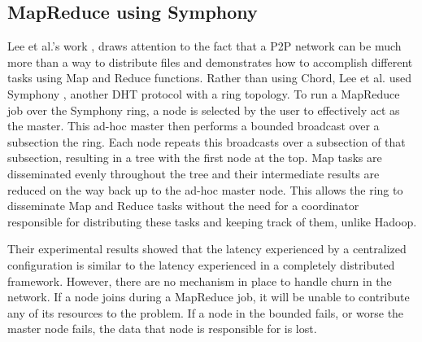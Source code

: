 \documentclass[10pt, conference, compsocconf]{IEEEtran}
\begin{document}

\subsection{MapReduce using Symphony}

Lee et al.'s work \cite{leemap}, draws attention to the fact that a P2P network can be much more than a way to distribute files and demonstrates how to accomplish different tasks using Map and Reduce functions.  Rather than using Chord, Lee et al. used Symphony \cite{symphony}, another DHT protocol with a ring topology.  To run a MapReduce job over the Symphony ring, a node is selected by the user to effectively act as the master.  This ad-hoc master then performs a bounded broadcast over a subsection the ring.  Each node repeats this broadcasts over a subsection of that subsection, resulting in a tree with the first node at the top.  Map tasks are disseminated evenly throughout the tree and their intermediate results are reduced on the way back up to the ad-hoc master node.  This allows the ring to disseminate Map and Reduce tasks without the need for a coordinator responsible for distributing these tasks and keeping track of them, unlike Hadoop.
 
Their experimental results showed that the latency experienced by a centralized configuration is similar to the latency experienced in a completely distributed framework.  However, there are no mechanism in place to handle churn in the network.  If a node joins during a MapReduce job, it will be unable to contribute any of its resources to the problem. If a node in the bounded fails, or worse the master node fails, the data that node is responsible for is lost. 

\end{document}
